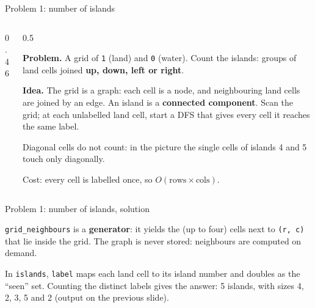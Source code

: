 \documentclass[aspectratio=169,10pt]{beamer}
\begin{document}
\begin{frame}{Problem 1: number of islands}
\begin{columns}[T]
\begin{column}{0.46\textwidth}
\begin{sfig}[0.6]
\begin{tikzpicture}
  
\end{tikzpicture}
\end{sfig}
\vspace{1mm}
\end{column}
\begin{column}{0.5\textwidth}
{\small
\textbf{Problem.} A grid of \texttt{1} (land) and \texttt{0} (water). Count the islands: groups of land cells joined \textbf{up, down, left or right}.

\vspace{2mm}
\textbf{Idea.} The grid is a graph: each cell is a node, and neighbouring land cells are joined by an edge. An island is a \textbf{connected component}. Scan the grid; at each unlabelled land cell, start a DFS that gives every cell it reaches the same label.

\vspace{2mm}
Diagonal cells do not count: in the picture the single cells of islands 4 and 5 touch only diagonally.

\vspace{2mm}
Cost: every cell is labelled once, so $O(\text{rows}\times\text{cols})$.}
\end{column}
\end{columns}
\end{frame}

\begin{frame}[allowframebreaks]{Problem 1: number of islands, solution}
\vspace{2mm}
{\small
\texttt{grid\_neighbours} is a \textbf{generator}: it yields the (up to four) cells next to \texttt{(r, c)} that lie inside the grid. The graph is never stored: neighbours are computed on demand.

\vspace{2mm}
In \texttt{islands}, \texttt{label} maps each land cell to its island number and doubles as the ``seen'' set. Counting the distinct labels gives the answer: 5 islands, with sizes 4, 2, 3, 5 and 2 (output on the previous slide).}
\framebreak
{}
\end{frame}
\end{document}
